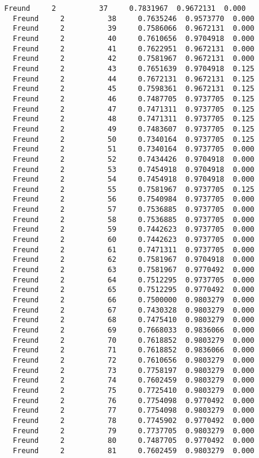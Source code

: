\documentclass[11pt]{article}
\begin{document}
\begin{Verbatim}[commandchars=\\\{\}]
  Freund     2          37     0.7831967  0.9672131  0.000
  Freund     2          38     0.7635246  0.9573770  0.000
  Freund     2          39     0.7586066  0.9672131  0.000
  Freund     2          40     0.7610656  0.9704918  0.000
  Freund     2          41     0.7622951  0.9672131  0.000
  Freund     2          42     0.7581967  0.9672131  0.000
  Freund     2          43     0.7651639  0.9704918  0.125
  Freund     2          44     0.7672131  0.9672131  0.125
  Freund     2          45     0.7598361  0.9672131  0.125
  Freund     2          46     0.7487705  0.9737705  0.125
  Freund     2          47     0.7471311  0.9737705  0.125
  Freund     2          48     0.7471311  0.9737705  0.125
  Freund     2          49     0.7483607  0.9737705  0.125
  Freund     2          50     0.7340164  0.9737705  0.125
  Freund     2          51     0.7340164  0.9737705  0.000
  Freund     2          52     0.7434426  0.9704918  0.000
  Freund     2          53     0.7454918  0.9704918  0.000
  Freund     2          54     0.7454918  0.9704918  0.000
  Freund     2          55     0.7581967  0.9737705  0.125
  Freund     2          56     0.7540984  0.9737705  0.000
  Freund     2          57     0.7536885  0.9737705  0.000
  Freund     2          58     0.7536885  0.9737705  0.000
  Freund     2          59     0.7442623  0.9737705  0.000
  Freund     2          60     0.7442623  0.9737705  0.000
  Freund     2          61     0.7471311  0.9737705  0.000
  Freund     2          62     0.7581967  0.9704918  0.000
  Freund     2          63     0.7581967  0.9770492  0.000
  Freund     2          64     0.7512295  0.9737705  0.000
  Freund     2          65     0.7512295  0.9770492  0.000
  Freund     2          66     0.7500000  0.9803279  0.000
  Freund     2          67     0.7430328  0.9803279  0.000
  Freund     2          68     0.7475410  0.9803279  0.000
  Freund     2          69     0.7668033  0.9836066  0.000
  Freund     2          70     0.7618852  0.9803279  0.000
  Freund     2          71     0.7618852  0.9836066  0.000
  Freund     2          72     0.7610656  0.9803279  0.000
  Freund     2          73     0.7758197  0.9803279  0.000
  Freund     2          74     0.7602459  0.9803279  0.000
  Freund     2          75     0.7725410  0.9803279  0.000
  Freund     2          76     0.7754098  0.9770492  0.000
  Freund     2          77     0.7754098  0.9803279  0.000
  Freund     2          78     0.7745902  0.9770492  0.000
  Freund     2          79     0.7737705  0.9803279  0.000
  Freund     2          80     0.7487705  0.9770492  0.000
  Freund     2          81     0.7602459  0.9803279  0.000

\end{Verbatim}
\end{document}
